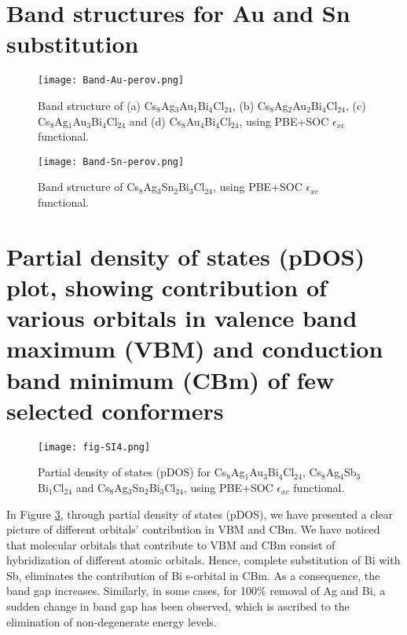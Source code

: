 \documentclass[journal=jpclcd,manuscript=letter]{achemso}
\begin{document}
\clearpage	
\section{{Band structures for Au and Sn substitution}}
\begin{figure}[H]
	\texttt{[image: Band-Au-perov.png]}
	\caption{Band structure of (a) Cs$_8$Ag$_3$Au$_1$Bi$_4$Cl$_{24}$, (b) Cs$_8$Ag$_2$Au$_2$Bi$_4$Cl$_{24}$, (c) Cs$_8$Ag$_1$Au$_3$Bi$_4$Cl$_{24}$ and (d) Cs$_8$Au$_4$Bi$_4$Cl$_{24}$, using PBE+SOC $\epsilon_{xc}$ functional.}
	\label{fig4}
\end{figure}
\begin{figure}[H]
	\texttt{[image: Band-Sn-perov.png]}
	\caption{Band structure of Cs$_8$Ag$_3$Sn$_2$Bi$_3$Cl$_{24}$, using PBE+SOC $\epsilon_{xc}$ functional.}
	\label{fig5}
\end{figure}
\section{{Partial density of states (pDOS) plot, showing contribution of various orbitals in valence band maximum (VBM) and conduction band minimum (CBm) of few selected conformers}}
\begin{figure}[H]
	\centering
	\texttt{[image: fig-SI4.png]}
	\caption{Partial density of states (pDOS) for Cs$_8$Ag$_{1}$Au$_{3}$Bi$_4$Cl$_{24}$, Cs$_8$Ag$_4$Sb$_{3}$Bi$_{1}$Cl$_{24}$ and Cs$_8$Ag$_{3}$Sn$_{2}$Bi$_{3}$Cl$_{24}$, using PBE+SOC $\epsilon_{xc}$ functional.}
	\label{fig6}
\end{figure}
In Figure \ref{fig6}, through partial density of states (pDOS), we have presented a clear picture of different orbitals' contribution in VBM and CBm. We have noticed that molecular orbitals that contribute to VBM and CBm consist of hybridization of different atomic orbitals. Hence, complete substitution of Bi with Sb, eliminates the contribution of Bi s-orbital in CBm. As a consequence, the band gap increases. Similarly, in some cases, for 100\% removal of Ag and Bi, a sudden change in band gap has been observed, which is ascribed to the elimination of non-degenerate energy levels. 
\end{document}
